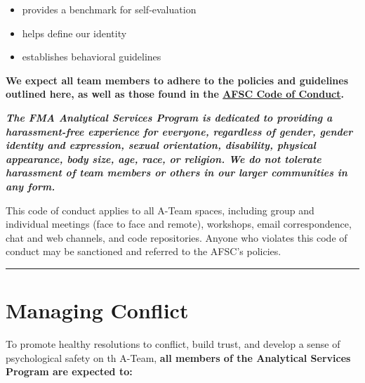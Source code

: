 \documentclass[
  letterpaper,
  DIV=11,
  numbers=noendperiod]{scrreprt}
\providecommand{\tightlist}{%
  \setlength{\itemsep}{0pt}\setlength{\parskip}{0pt}}\usepackage{longtable,booktabs,array}
\begin{document}
\begin{itemize}
\tightlist
\item
  provides a benchmark for self-evaluation
\item
  helps define our identity
\item
  establishes behavioral guidelines
\end{itemize}

\textbf{We expect all team members to adhere to the policies and
guidelines outlined here, as well as those found in the
\href{https://drive.google.com/file/d/1wV0g2Tea0jdPjsTeNNST7I871j70qLAw/view}{AFSC
Code of Conduct}.}

\textbf{\emph{The FMA Analytical Services Program is dedicated to
providing a harassment-free experience for everyone, regardless of
gender, gender identity and expression, sexual orientation, disability,
physical appearance, body size, age, race, or religion. We do not
tolerate harassment of team members or others in our larger communities
in any form.}}

This code of conduct applies to all A-Team spaces, including group and
individual meetings (face to face and remote), workshops, email
correspondence, chat and web channels, and code repositories. Anyone who
violates this code of conduct may be sanctioned and referred to the
AFSC's policies.

\begin{center}\rule{0.5\linewidth}{0.5pt}\end{center}

\section{Managing Conflict}\label{managing-conflict}

To promote healthy resolutions to conflict, build trust, and develop a
sense of psychological safety on th A-Team, \textbf{all members of the
Analytical Services Program are expected to:}
\end{document}
